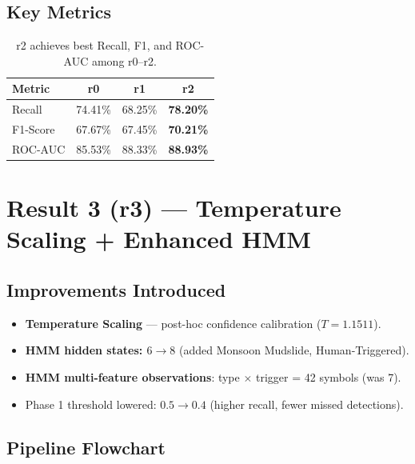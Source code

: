 \documentclass[12pt,a4paper]{article}
\begin{document}
\subsection{Key Metrics}
\begin{table}[H]\centering
\begin{tabular}{lccc}
\toprule
\textbf{Metric} & \textbf{r0} & \textbf{r1} & \textbf{r2} \\
\midrule
Recall    & 74.41\% & 68.25\% & \textbf{78.20\%} \\
F1-Score  & 67.67\% & 67.45\% & \textbf{70.21\%} \\
ROC-AUC   & 85.53\% & 88.33\% & \textbf{88.93\%} \\
\bottomrule
\end{tabular}
\caption{r2 achieves best Recall, F1, and ROC-AUC among r0--r2.}
\end{table}


\newpage
\section{Result 3 (r3) --- Temperature Scaling + Enhanced HMM}

\subsection{Improvements Introduced}
\begin{itemize}[nosep]
  \item \colorbox{newbox}{\textbf{Temperature Scaling}} --- post-hoc confidence calibration ($T = 1.1511$).
  \item \colorbox{newbox}{\textbf{HMM hidden states: $6 \to 8$}} (added Monsoon Mudslide, Human-Triggered).
  \item \colorbox{newbox}{\textbf{HMM multi-feature observations}}: type $\times$ trigger = 42 symbols (was 7).
  \item Phase 1 threshold lowered: $0.5 \to 0.4$ (higher recall, fewer missed detections).
\end{itemize}

\subsection{Pipeline Flowchart}
\end{document}
